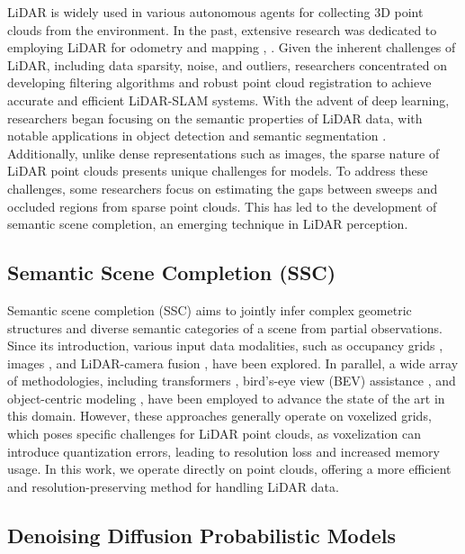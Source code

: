 \documentclass[conference]{IEEEtran}
\begin{document}
LiDAR is widely used in various autonomous agents for collecting 3D point clouds from the environment.
In the past, extensive research was dedicated to employing LiDAR for odometry \cite{jquenzelands2020} and mapping \cite{ddroeschelands2020}, \cite{xzhong2021}.
Given the inherent challenges of LiDAR, including data sparsity, noise, and outliers, researchers concentrated on developing filtering algorithms \cite{rrusu2011} and robust point cloud registration \cite{ivizzo2019} to achieve accurate and efficient LiDAR-SLAM systems.
With the advent of deep learning, researchers began focusing on the semantic properties of LiDAR data, with notable applications in object detection \cite{mwang2022} and semantic segmentation \cite{yli2021}.
Additionally, unlike dense representations such as images, the sparse nature of LiDAR point clouds presents unique challenges for models.
To address these challenges, some researchers focus on estimating the gaps between sweeps and occluded regions from sparse point clouds.
This has led to the development of semantic scene completion, an emerging technique in LiDAR perception.

\subsection{Semantic Scene Completion (SSC)}

Semantic scene completion (SSC) aims to jointly infer complex geometric structures and diverse semantic categories of a scene from partial observations.
Since its introduction, various input data modalities, such as occupancy grids \cite{lroldao2020}, images \cite{aqa}, and LiDAR-camera fusion \cite{hcaoands2023}, have been explored.
In parallel, a wide array of methodologies, including transformers \cite{hcao}, bird's-eye view (BEV) assistance \cite{rcheng2024}, and object-centric modeling \cite{hcaoands2024}, have been employed to advance the state of the art in this domain.
However, these approaches generally operate on voxelized grids, which poses specific challenges for LiDAR point clouds, as voxelization can introduce quantization errors, leading to resolution loss and increased memory usage.
In this work, we operate directly on point clouds, offering a more efficient and resolution-preserving method for handling LiDAR data.

\subsection{Denoising Diffusion Probabilistic Models}
\end{document}
